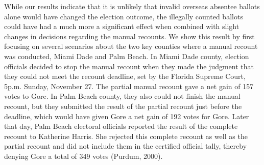 \documentclass[11pt,titlepage]{article}
\begin{document}
While our results indicate that it is unlikely that invalid overseas
absentee ballots alone would have changed the election outcome, the
illegally counted ballots could have had a much more a significant
effect when combined with slight changes in decisions regarding the
manual recounts.  We show this result by first focusing on several
scenarios about the two key counties where a manual recount was
conducted, Miami Dade and Palm Beach. In Miami Dade county, election
officials decided to stop the manual recount when they made the
judgment that they could not meet the recount deadline, set by the
Florida Supreme Court, 5p.m.  Sunday, November 27.  The partial manual
recount gave a net gain of 157 votes to Gore. In Palm Beach county,
they also could not finish the manual recount, but they submitted the
result of the partial recount just before the deadline, which would
have given Gore a net gain of 192 votes for Gore. Later that day, Palm
Beach electoral officials reported the result of the complete recount
to Katherine Harris.  She rejected this complete recount as well as
the partial recount and did not include them in the certified official
tally, thereby denying Gore a total of 349 votes
\nocite{purd:00}(Purdum, 2000).
\end{document}
